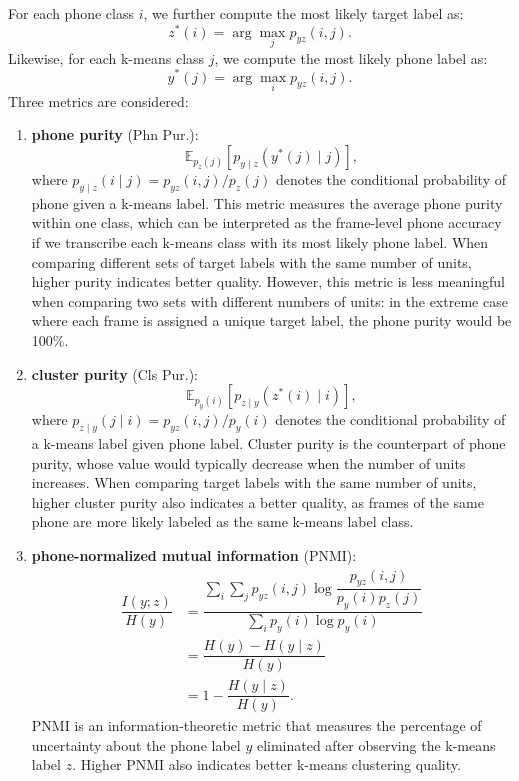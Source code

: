 For each phone class $i$, we further compute the most likely target label as:
\begin{equation}
    z^*(i) = \arg\max_j p_{yz}(i, j).
\end{equation}
Likewise, for each k-means class $j$, we compute the most likely phone label as:
\begin{equation}
    y^*(j) = \arg\max_i p_{yz}(i, j).
\end{equation}
Three metrics are considered:
\begin{enumerate}
    \item \textbf{phone purity} (Phn Pur.): 
    \begin{equation}
        \mathbb{E}_{p_z(j)} [ p_{y \mid z}(y^*(j) \mid j) ],
    \end{equation}
    where $p_{y \mid z}(i \mid j) = p_{yz}(i, j) / p_z(j)$ denotes the conditional probability of phone given a k-means label. This metric measures the average phone purity within one class, which can be interpreted as the frame-level phone accuracy if we transcribe each k-means class with its most likely phone label. When comparing different sets of target labels with the same number of units, higher purity indicates better quality. However, this metric is less meaningful when comparing two sets with different numbers of units: in the extreme case where each frame is assigned a unique target label, the phone purity would be 100\%.
    \item \textbf{cluster purity} (Cls Pur.):
    \begin{equation}
        \mathbb{E}_{p_y(i)} [ p_{z \mid y}(z^*(i) \mid i) ],
    \end{equation}
    where $p_{z \mid y}(j \mid i) = p_{yz}(i, j) / p_y(i)$ denotes the conditional probability of a k-means label given phone label. Cluster purity is the counterpart of phone purity, whose value would typically decrease when the number of units increases. When comparing target labels with the same number of units, higher cluster purity also indicates a better quality, as frames of the same phone are more likely labeled as the same k-means label class.
    \item \textbf{phone-normalized mutual information} (PNMI):
    \begin{align}
        \dfrac{I(y; z)}{H(y)} &= \dfrac{ 
            \sum_i \sum_j p_{yz}(i, j) \log \dfrac{p_{yz}(i, j)}{p_{y}(i)p_{z}(j)}
        }{
            \sum_i p_{y}(i) \log p_{y}(i)
        } \\
        &= \dfrac{H(y) - H(y \mid z)} {H(y)} \\
        &= 1 - \dfrac{H(y \mid z)} {H(y)}.
    \end{align}
    PNMI is an information-theoretic metric that measures the percentage of uncertainty about the phone label $y$ eliminated after observing the k-means label $z$. Higher PNMI also indicates better k-means clustering quality.
\end{enumerate}

